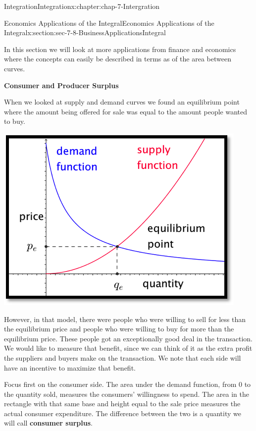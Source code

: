 \documentclass[oneside,10pt,]{book}
\newcommand{\terminology}[1]{\textbf{#1}}
\numberwithin{equation}{section}
\begin{document}
\begin{chapterptx}{Integration}{}{Integration}{}{}{x:chapter:chap-7-Intergration}
\begin{sectionptx}{Economics Applications of the Integral}{}{Economics Applications of the Integral}{}{}{x:section:sec-7-8-BusinessApplicationsIntegral}
\par
In this section we will look at more applications from finance and economics where the concepts can easily be described in terms as of the area between curves.%
\par
\terminology{Consumer and Producer Surplus}%
\par
When we looked at supply and demand curves we found an equilibrium point where the amount being offered for sale was equal to the amount people wanted to buy.%
\begin{sidebyside}{1}{0.25}{0.25}{0}%
\begin{sbspanel}{0.5}%
\includegraphics[width=\linewidth]{images/sec7-8-1.png}
\end{sbspanel}%
\end{sidebyside}%
\par
However, in that model, there were people who were willing to sell for less than the equilibrium price and people who were willing to buy for more than the equilibrium price.  These people got an exceptionally good deal in the transaction.  We would like to measure that benefit, since we can think of it as the extra profit the suppliers and buyers make on the transaction.  We note that each side will have an incentive to maximize that benefit.%
\par
Focus first on the consumer side.  The area under the demand function, from 0 to the quantity sold, measures the consumers’ willingness to spend.  The area in the rectangle with that same base and height equal to the sale price measures the actual consumer expenditure.  The difference between the two is a quantity we will call \terminology{consumer surplus}.%

\end{sectionptx}
\end{chapterptx}
\end{document}
